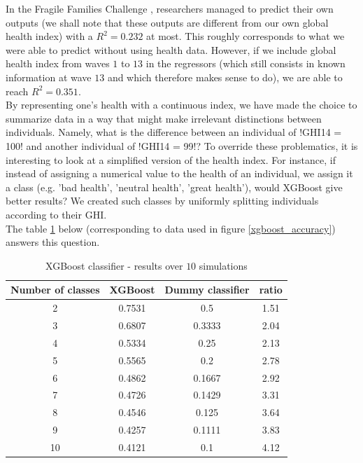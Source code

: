\documentclass[]{article}
\begin{document}
\noindent
In the Fragile Families Challenge \cite{challenge2017}, researchers managed to predict their own outputs (we shall note that these outputs are different from our own global health index) with a $R^2 = 0.232$ at most. This roughly corresponds to what we were able to predict without using health data. However, if we include global health index from waves $1$ to $13$ in the regressors (which still consists in known information at wave $13$ and which therefore makes sense to do), we are able to reach $R^2=0.351$.\\

\noindent
By representing one's health with a continuous index, we have made the choice to summarize data in a way that might make irrelevant distinctions between individuals. Namely, what is the difference between an individual of \pyth!GHI14 = 100! and another individual of \pyth!GHI14 = 99!? To override these problematics, it is interesting to look at a simplified version of the health index. For instance, if instead of assigning a numerical value to the health of an individual, we assign it a class (e.g. 'bad health', 'neutral health', 'great health'), would XGBoost give better results? We created such classes by uniformly splitting individuals according to their GHI.\\
The table \ref{results_xgbclassifier} below (corresponding to data used in figure \ref{xgboost_accuracy})  answers this question.
\begin{table}[!h]
	\centering
	\begin{tabular}{|c|c|c|c|}
		\hline
		
		\textbf{Number of classes} & \textbf{XGBoost} & \textbf{Dummy classifier} & \textbf{ratio}\\
		\hline
		2 & 0.7531 & 0.5 & 1.51\\
		\hline 
		3 & 0.6807 & 0.3333 & 2.04\\
		\hline 
		4 & 0.5334 & 0.25 & 2.13\\
		\hline 
		5 & 0.5565 & 0.2 & 2.78\\
		\hline 
		6 & 0.4862 & 0.1667 & 2.92\\
		\hline 
		7 & 0.4726 & 0.1429 & 3.31\\
		\hline 
		8 & 0.4546 & 0.125 & 3.64\\
		\hline 
		9 & 0.4257 & 0.1111 & 3.83\\
		\hline 
		10 & 0.4121 & 0.1 & 4.12\\
		\hline 
	\end{tabular}
	\caption{XGBoost classifier - results over $10$ simulations}
	\label{results_xgbclassifier}
\end{table}\\
\end{document}
